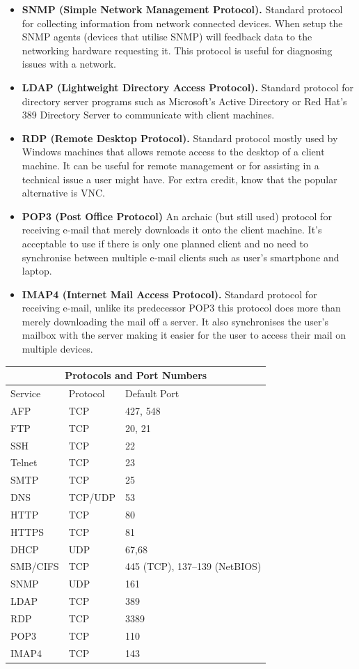 \documentclass{article}
\begin{document}
\begin{itemize}
    \item \textbf{SNMP (Simple Network Management Protocol).} Standard protocol for collecting information from network connected devices. When setup the SNMP agents (devices that utilise SNMP) will feedback data to the networking hardware requesting it. This protocol is useful for diagnosing issues with a network.
    \item \textbf{LDAP (Lightweight Directory Access Protocol).} Standard protocol for directory server programs such as Microsoft's Active Directory or Red Hat's 389 Directory Server to communicate with client machines.
    \item \textbf{RDP (Remote Desktop Protocol).} Standard protocol mostly used by Windows machines that allows remote access to the desktop of a client machine. It can be useful for remote management or for assisting in a technical issue a user might have. For extra credit, know that the popular alternative is VNC.
    \item \textbf{POP3 (Post Office Protocol)} An archaic (but still used) protocol for receiving e-mail that merely downloads it onto the client machine. It's acceptable to use if there is only one planned client and no need to synchronise between multiple e-mail clients such as user's smartphone and laptop.
    \item \textbf{IMAP4 (Internet Mail Access Protocol).} Standard protocol for receiving e-mail, unlike its predecessor POP3 this protocol does more than merely downloading the mail off a server. It also synchronises the user's mailbox with the server making it easier for the user to access their mail on multiple devices.
    
\end{itemize}

\begin{tabular}{ |p{3cm}||p{2cm}|p{5cm}|  }
 \hline
 \multicolumn{3}{|c|}{\textbf{Protocols and Port Numbers}} \\
 \hline
 Service & Protocol & Default Port\\
 \hline
 AFP & TCP & 427, 548 \\
 FTP & TCP & 20, 21\\
 SSH & TCP & 22\\ %
 Telnet & TCP & 23\\ 
 SMTP & TCP & 25\\
 DNS & TCP/UDP & 53\\ %
 HTTP & TCP & 80 \\
 HTTPS & TCP & 81 \\
 DHCP & UDP & 67,68\\
 SMB/CIFS & TCP & 445 (TCP), 137--139 (NetBIOS)\\
 SNMP & UDP & 161 \\
 LDAP & TCP & 389\\
 RDP & TCP & 3389\\
 POP3 & TCP & 110\\
 IMAP4 & TCP & 143\\
 \hline
\end{tabular}
\end{document}
